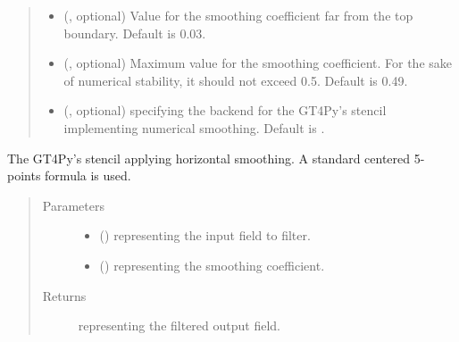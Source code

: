 \documentclass[letterpaper,10pt,english]{sphinxmanual}
\begin{document}
\begin{fulllineitems}
\begin{fulllineitems}
\begin{quote}
\begin{description}
\begin{itemize}
\item {} 
 (, optional) \textendash{} Value for the smoothing coefficient far from the top boundary. Default is 0.03.

\item {} 
 (, optional) \textendash{} Maximum value for the smoothing coefficient. For the sake of numerical stability, it should not
exceed 0.5. Default is 0.49.

\item {} 
 (, optional) \textendash{}  specifying the backend for the GT4Py’s stencil implementing numerical
smoothing. Default is .

\end{itemize}

\end{description}\end{quote}

\end{fulllineitems}


\begin{fulllineitems}
\label{\detokenize{api:dycore.horizontal_smoothing.HorizontalSmoothingSecondOrderXZ._stencil_defs}}
The GT4Py’s stencil applying horizontal smoothing. A standard centered 5-points formula is used.
\begin{quote}\begin{description}
\item[{Parameters}] \leavevmode\begin{itemize}
\item {} 
 () \textendash{}  representing the input field to filter.

\item {} 
 () \textendash{}  representing the smoothing coefficient.

\end{itemize}

\item[{Returns}] \leavevmode
{} representing the filtered output field.


\end{description}
\end{quote}
\end{fulllineitems}
\end{fulllineitems}
\end{document}
